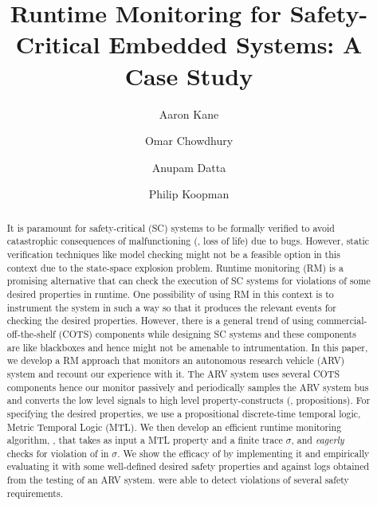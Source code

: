 \documentclass[]{./llncs}
\begin{document}
\title{Runtime Monitoring for Safety-Critical Embedded Systems: A Case Study}


\author{Aaron Kane \and Omar Chowdhury \and Anupam Datta \and Philip Koopman}



\maketitle



\begin{abstract}
It is paramount for safety-critical (SC) systems to be formally verified to avoid 
catastrophic consequences  of malfunctioning (\eg, loss of life) due to bugs. 
However, static verification techniques like model checking might not be a feasible option in this context due to the state-space 
explosion problem. Runtime monitoring (RM) is a promising alternative 
that can check the execution of SC systems for violations of some desired properties in runtime. One possibility of using RM in this context is to instrument 
the system 
in such a way so that it 
produces the relevant events for checking the desired 
properties. However, there is a general trend of using commercial-off-the-shelf (COTS) components 
while designing SC systems and these components are like blackboxes and hence might not be amenable to  
intrumentation. In this paper, we develop a RM approach that monitors an autonomous research vehicle (ARV) system and recount our experience with it. 
The ARV system uses several COTS components hence our monitor passively and periodically samples the ARV system bus 
and converts the low level signals to high level 
property-constructs (\ie, propositions). For specifying the desired properties, we use a propositional discrete-time temporal logic, Metric Temporal Logic (MTL). 
We then develop an efficient runtime monitoring algorithm, \monitor, that takes as input a MTL property \policy and a finite trace $\sigma$, and \emph{eagerly} 
checks for violation of \policy in $\sigma$. We show the efficacy of \monitor by implementing it and empirically evaluating it  
with some well-defined desired safety properties and against logs obtained from the testing of an ARV system. 
\monitor were able to detect violations of several safety requirements. 
\end{abstract}
\end{document}
